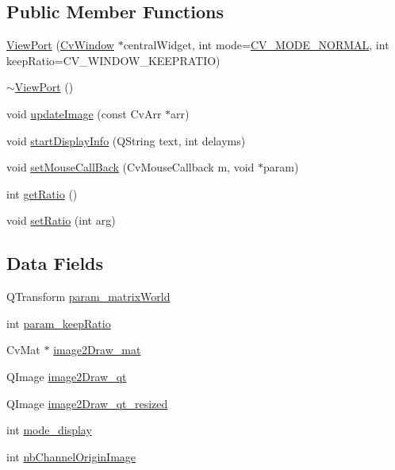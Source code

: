 \subsection*{Public Member Functions}
\begin{DoxyCompactItemize}
\item 
\hyperlink{classViewPort_ae986eca6567919eccfa84fa11d152519}{View\-Port} (\hyperlink{classCvWindow}{Cv\-Window} $\ast$central\-Widget, int mode=\hyperlink{window__QT_8h_adf764cbdea00d65edcd07bb9953ad2b7a8f4516cd4423037ff9e7c533c4084e64}{C\-V\-\_\-\-M\-O\-D\-E\-\_\-\-N\-O\-R\-M\-A\-L}, int keep\-Ratio=C\-V\-\_\-\-W\-I\-N\-D\-O\-W\-\_\-\-K\-E\-E\-P\-R\-A\-T\-I\-O)
\item 
\hyperlink{classViewPort_aa9e30578206a4c74b8e3e0bf1cbed5a1}{$\sim$\-View\-Port} ()
\item 
void \hyperlink{classViewPort_a19c83263889430a83e5f9d1aaee4741b}{update\-Image} (const Cv\-Arr $\ast$arr)
\item 
void \hyperlink{classViewPort_a2618b2c40f1770ab153cbae4da9c5313}{start\-Display\-Info} (Q\-String text, int delayms)
\item 
void \hyperlink{classViewPort_a725688baa203c6247e9a147acaa7597a}{set\-Mouse\-Call\-Back} (Cv\-Mouse\-Callback m, void $\ast$param)
\item 
int \hyperlink{classViewPort_a969eb1a036822f1f500dd832c1f45d11}{get\-Ratio} ()
\item 
void \hyperlink{classViewPort_ad250b6cf4dd6d571128a7ad0d4d98175}{set\-Ratio} (int arg)
\end{DoxyCompactItemize}
\subsection*{Data Fields}
\begin{DoxyCompactItemize}
\item 
Q\-Transform \hyperlink{classViewPort_a4404db6e34a91d2e2e4c5026840a2adc}{param\-\_\-matrix\-World}
\item 
int \hyperlink{classViewPort_a2ad627e7c8f030da5b252cfbb056164b}{param\-\_\-keep\-Ratio}
\item 
Cv\-Mat $\ast$ \hyperlink{classViewPort_af6a3576406241b379379cc6d1a6d0c4f}{image2\-Draw\-\_\-mat}
\item 
Q\-Image \hyperlink{classViewPort_affb4d66105d8c57b62a8d1ca3a2f2aae}{image2\-Draw\-\_\-qt}
\item 
Q\-Image \hyperlink{classViewPort_a69c446903d67c1e328c8398341c2da21}{image2\-Draw\-\_\-qt\-\_\-resized}
\item 
int \hyperlink{classViewPort_abdd3f74adf3deb4bc1808f669d8815a4}{mode\-\_\-display}
\item 
int \hyperlink{classViewPort_a023381fa2838df1c3ef3a9183f4abbd1}{nb\-Channel\-Origin\-Image}
\end{DoxyCompactItemize}


